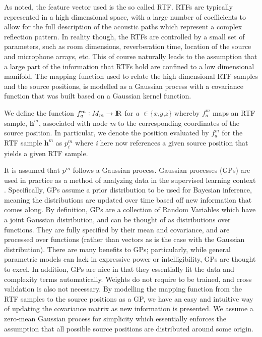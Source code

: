 \documentclass{article}
\begin{document}
As noted, the feature vector used is the so called RTF. RTFs are typically represented in a high dimensional space, with a large number of coefficients to allow for the full description of the acoustic paths which represent a complex reflection pattern. In reality though, the RTFs are controlled by a small set of parameters, such as room dimensions, reverberation time, location of the source and microphone arrays, etc. This of course naturally leads to the assumption that a large part of the information that RTFs hold are confined to a low dimensional manifold. The mapping function used to relate the high dimensional RTF samples and the source positions, is modelled as a Gaussian process with a covariance function that was built based on a Gaussian kernel function. 

We define the function $\textit{${f}^m_a$} : \textit{$M_m$} \rightarrow {\rm I\!R}$ for \textit{a} $\in \{\textit{x,y,z}\}$ whereby \textit{${f}^m_a$} maps an RTF sample, $\textbf{h}^\textit{m}$, associated with node \textit{m} to the corresponding coordinates of the source position. In particular, we denote the position evaluated by \textit{${f}^m_a$} for the RTF sample $\textbf{h}^\textit{m}$ as \textit{${p}_i^m$} where \textit{i} here now references a given source position that yields a given RTF sample.

It is assumed that \textit{${p}^m$} follows a Gaussian process. Gaussian processes (GPs) are used in practice as a method of analyzing data in the supervised learning context \cite{CER_gaussianProInML}. Specifically, GPs assume a prior distribution to be used for Bayesian inference, meaning the distributions are updated over time based off new information that comes along. By definition, GPs are a collection of Random Variables which have a joint Gaussian distribution, and can be thought of as distributions over functions. They are fully specified by their mean and covariance, and are processed over functions (rather than vectors as is the case with the Gaussian distribution). There are many benefits to GPs; particularly, while general parametric models can lack in expressive power or intelligibility, GPs are thought to excel. In addition, GPs are nice in that they essentially fit the data and complexity terms automatically. Weights do not require to be trained, and cross validation is also not necessary. By modelling the mapping function from the RTF samples to the source positions as a GP, we have an easy and intuitive way of updating the covariance matrix as new information is presented. We assume a zero-mean Gaussian process for simplicity which essentially enforces the assumption that all possible source positions are distributed around some origin. 
\end{document}
